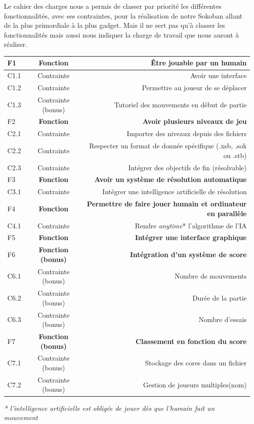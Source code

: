 \documentclass[a4paper,12pt]{article} %
\begin{document}
	Le cahier des charges nous a permis de classer par priorité les différentes fonctionnalités, avec ses contraintes, pour la réalisation de notre Sokoban allant de la plus primordiale à la plus gadget. Mais il ne sert pas qu'à classer les fonctionnalités mais aussi nous indiquer la charge de travail que nous auront à réaliser.
	
	\begin{center}
	\begin{tabular}{| l | c | r |}
	\hline
	F1 & \textbf{Fonction} & \textbf{Être jouable par un humain} \\ \hline %
	C1.1 & Contrainte & Avoir une interface \\ \hline
	C1.2 & Contrainte & Permettre au joueur de se déplacer \\ \hline
	C1.3 & Contrainte (bonus) & Tutoriel des mouvements en début de partie \\ \hline
	F2 & \textbf{Fonction} & \textbf{Avoir plusieurs niveaux de jeu} \\ \hline
	C2.1 & Contrainte & Importer des niveaux depuis des fichiers \\ \hline
	C2.2 & Contrainte & Respecter un format de donnée spécifique (.xsb, .sok ou .stb) \\ \hline
	C2.3 & Contrainte & Intégrer des objectifs de fin (résolvable) \\ \hline
	F3 & \textbf{Fonction} & \textbf{Avoir un système de résolution automatique} \\ \hline %
	C3.1 & Contrainte & Intégrer une intelligence artificielle de résolution \\ \hline
	F4 & \textbf{Fonction} & \textbf{Permettre de faire jouer humain et ordinateur en parallèle} \\ \hline
	C4.1 & Contrainte & Rendre \textit{anytime}* l'algorithme de l'IA \\ \hline
	F5 & \textbf{Fonction} & \textbf{Intégrer une interface graphique} \\ \hline
	F6 & \textbf{Fonction (bonus)} & \textbf{Intégration d'un système de score} \\ \hline %
	C6.1 & Contrainte (bonus) & Nombre de mouvements \\ \hline
	C6.2 & Contrainte (bonus) & Durée de la partie \\ \hline
	C6.3 & Contrainte (bonus) & Nombre d'essais \\ \hline
	F7 & \textbf{Fonction (bonus)} & \textbf{Classement en fonction du score} \\ \hline
	C7.1 & Contrainte (bonus) & Stockage des cores dans un fichier \\ \hline
	C7.2 & Contrainte (bonus) & Gestion de joueurs multiples(nom) \\ \hline
	\hline
	\end{tabular}
	\vspace{0.01cm}
	\textit{* l’intelligence artificielle est obligée de jouer dès que l'humain fait un mouvement}
	\end{center}
			
\end{document}
